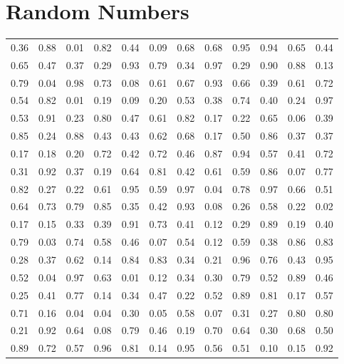 \chapter{Random Numbers}
\label{appendix:randomnums}

\begin{center}
\setlength{\tabcolsep}{10pt}
\renewcommand{\arraystretch}{1.25}
\begin{tabular}{llllllllllll}
0.36 & 0.88 & 0.01 & 0.82 & 0.44 & 0.09 & 0.68 & 0.68 & 0.95 & 0.94 & 0.65 & 0.44 \\
0.65 & 0.47 & 0.37 & 0.29 & 0.93 & 0.79 & 0.34 & 0.97 & 0.29 & 0.90 & 0.88 & 0.13 \\
0.79 & 0.04 & 0.98 & 0.73 & 0.08 & 0.61 & 0.67 & 0.93 & 0.66 & 0.39 & 0.61 & 0.72 \\
0.54 & 0.82 & 0.01 & 0.19 & 0.09 & 0.20 & 0.53 & 0.38 & 0.74 & 0.40 & 0.24 & 0.97 \\
0.53 & 0.91 & 0.23 & 0.80 & 0.47 & 0.61 & 0.82 & 0.17 & 0.22 & 0.65 & 0.06 & 0.39 \\
0.85 & 0.24 & 0.88 & 0.43 & 0.43 & 0.62 & 0.68 & 0.17 & 0.50 & 0.86 & 0.37 & 0.37 \\
0.17 & 0.18 & 0.20 & 0.72 & 0.42 & 0.72 & 0.46 & 0.87 & 0.94 & 0.57 & 0.41 & 0.72 \\
0.31 & 0.92 & 0.37 & 0.19 & 0.64 & 0.81 & 0.42 & 0.61 & 0.59 & 0.86 & 0.07 & 0.77 \\
0.82 & 0.27 & 0.22 & 0.61 & 0.95 & 0.59 & 0.97 & 0.04 & 0.78 & 0.97 & 0.66 & 0.51 \\
0.64 & 0.73 & 0.79 & 0.85 & 0.35 & 0.42 & 0.93 & 0.08 & 0.26 & 0.58 & 0.22 & 0.02 \\
0.17 & 0.15 & 0.33 & 0.39 & 0.91 & 0.73 & 0.41 & 0.12 & 0.29 & 0.89 & 0.19 & 0.40 \\
0.79 & 0.03 & 0.74 & 0.58 & 0.46 & 0.07 & 0.54 & 0.12 & 0.59 & 0.38 & 0.86 & 0.83 \\
0.28 & 0.37 & 0.62 & 0.14 & 0.84 & 0.83 & 0.34 & 0.21 & 0.96 & 0.76 & 0.43 & 0.95 \\
0.52 & 0.04 & 0.97 & 0.63 & 0.01 & 0.12 & 0.34 & 0.30 & 0.79 & 0.52 & 0.89 & 0.46 \\
0.25 & 0.41 & 0.77 & 0.14 & 0.34 & 0.47 & 0.22 & 0.52 & 0.89 & 0.81 & 0.17 & 0.57 \\
0.71 & 0.16 & 0.04 & 0.04 & 0.30 & 0.05 & 0.58 & 0.07 & 0.31 & 0.27 & 0.80 & 0.80 \\
0.21 & 0.92 & 0.64 & 0.08 & 0.79 & 0.46 & 0.19 & 0.70 & 0.64 & 0.30 & 0.68 & 0.50 \\
0.89 & 0.72 & 0.57 & 0.96 & 0.81 & 0.14 & 0.95 & 0.56 & 0.51 & 0.10 & 0.15 & 0.92 \\

\end{tabular}
\end{center}
